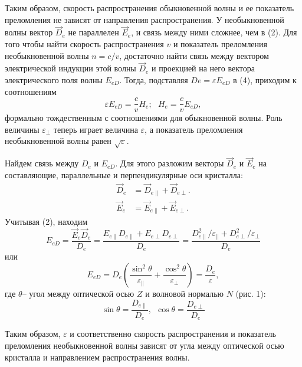 \documentclass[journal, a4paper]{IEEEtran}
\begin{document}
Таким образом, скорость распространения обыкновенной волны
и ее показатель преломления не зависят от направления распространения.
У необыкновенной волны вектор
$\vec{D}_e$ не параллелен
$\vec{E}_e$, и связь между
ними сложнее, чем в (2).
Для того чтобы найти скорость распространения $v$ и показатель преломления необыкновенной волны
$n=c/v$, достаточно найти связь между вектором электрической индукции этой волны
$\vec{D}_e$ и проекцией на него
вектора электрического поля волны
$E_{eD}$. Тогда, подставляя
$De = \varepsilon E_{eD}$
в (4), приходим
к соотношениям\[
\varepsilon E_{eD} = \frac{c}{v}H_e;~~~
H_e=\frac{c}{v}E_{eD},
\]
формально тождественным с соотношениями для обыкновенной волны.
Роль величины $\varepsilon_{\perp}$ теперь играет величина $\varepsilon$, а показатель преломления
необыкновенной волны равен
$\sqrt{\varepsilon}$.

Найдем связь между
${D}_e$ и
$E_{eD}$. Для этого разложим векторы
$\vec{D}_e$ и $\vec{E}_e$ на составляющие, параллельные
и перпендикулярные оси кристалла:
\[
\begin{aligned}
\vec{D}_e&=\vec{D}_{e\|}+\vec{D}_{e\perp}.\\
\vec{E}_e&=\vec{E}_{e\|}+\vec{E}_{e\perp}.
\end{aligned}
\]
Учитывая (2), находим
\[
E_{eD}=\frac{\vec{E}_e\vec{D}_e}{D_e}=
\frac{E_{e\|}D_{e\|}+E_{e\perp}D_{e\perp}}{D_e}=\frac{D_{e\|}^2/\varepsilon_{\|}+D_{e\perp}^2/\varepsilon_{\perp}}{D_e}
\]
или
\[
E_{eD}=D_e\left(\frac{\sin^2{\theta}}{\varepsilon_{\|}}+\frac{\cos^2{\theta}}{\varepsilon_{\perp}}\right)=\frac{D_e}{\varepsilon},
\]
где $\theta$-- угол между оптической осью
$Z$ и волновой нормалью $N$ (рис. 1):
\begin{equation}
\sin{\theta}=\frac{D_{e\|}}{D_e},~~\cos{\theta}=\frac{D_{e\perp}}{D_e}
\end{equation}

Таким образом, $\varepsilon$ и соответственно скорость распространения
и показатель преломления необыкновенной волны зависят от угла между оптической осью кристалла
и направлением распространения волны.
\end{document}

